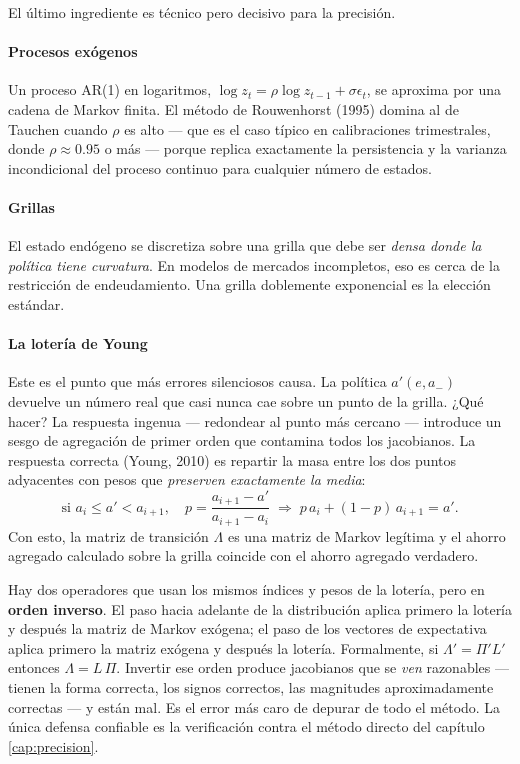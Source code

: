 El último ingrediente es técnico pero decisivo para la precisión.

\paragraph{Procesos exógenos} Un proceso AR(1) en logaritmos,
$\log z_t = \rho \log z_{t-1} + \sigma\epsilon_t$, se aproxima por una cadena de
Markov finita. El método de Rouwenhorst (1995) domina al de Tauchen cuando
$\rho$ es alto --- que es el caso típico en calibraciones trimestrales, donde
$\rho \approx 0.95$ o más --- porque replica exactamente la persistencia y la
varianza incondicional del proceso continuo para cualquier número de estados.

\paragraph{Grillas} El estado endógeno se discretiza sobre una grilla que debe
ser \emph{densa donde la política tiene curvatura}. En modelos de mercados
incompletos, eso es cerca de la restricción de endeudamiento. Una grilla
doblemente exponencial es la elección estándar.

\paragraph{La lotería de Young} Este es el punto que más errores silenciosos
causa. La política $a'(e,a_-)$ devuelve un número real que casi nunca cae sobre
un punto de la grilla. ¿Qué hacer? La respuesta ingenua --- redondear al punto
más cercano --- introduce un sesgo de agregación de primer orden que contamina
todos los jacobianos. La respuesta correcta (Young, 2010) es repartir la masa
entre los dos puntos adyacentes con pesos que \emph{preserven exactamente la
media}:
\begin{equation}
\text{si } a_i \le a' < a_{i+1}, \quad
p = \frac{a_{i+1}-a'}{a_{i+1}-a_i}
\;\Longrightarrow\;
p\, a_i + (1-p)\, a_{i+1} = a'.
\end{equation}
Con esto, la matriz de transición $\Lambda$ es una matriz de Markov legítima y
el ahorro agregado calculado sobre la grilla coincide con el ahorro agregado
verdadero.

\begin{trampa}
Hay dos operadores que usan los mismos índices y pesos de la lotería, pero en
\textbf{orden inverso}. El paso hacia adelante de la distribución aplica primero
la lotería y después la matriz de Markov exógena; el paso de los vectores de
expectativa aplica primero la matriz exógena y después la lotería. Formalmente,
si $\Lambda' = \Pi' L'$ entonces $\Lambda = L\,\Pi$. Invertir ese orden produce
jacobianos que se \emph{ven} razonables --- tienen la forma correcta, los signos
correctos, las magnitudes aproximadamente correctas --- y están mal. Es el error
más caro de depurar de todo el método. La única defensa confiable es la
verificación contra el método directo del capítulo \ref{cap:precision}.
\end{trampa}
